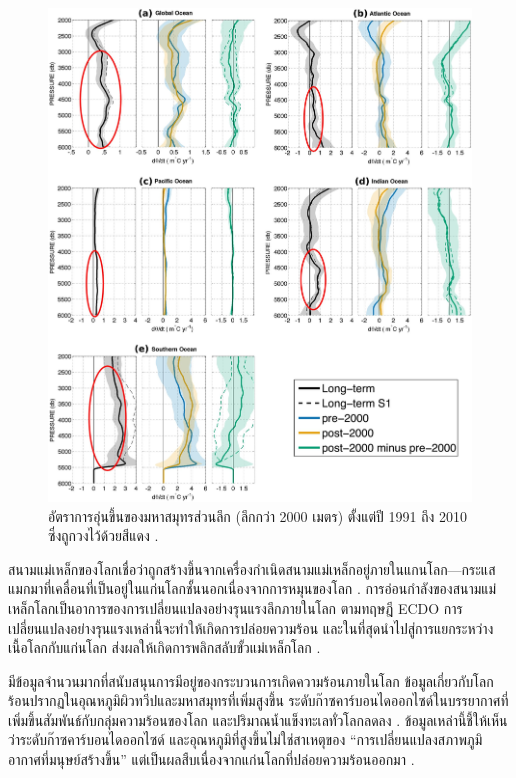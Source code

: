 \documentclass[10pt,twocolumn,letterpaper]{article}
\begin{document}
\begin{figure}[t]
\begin{center}
   \includegraphics[width=1\linewidth]{ocean-highlight.jpg}
\end{center}
   \caption{อัตราการอุ่นขึ้นของมหาสมุทรส่วนลึก (ลึกกว่า 2000 เมตร) ตั้งแต่ปี 1991 ถึง 2010 ซึ่งถูกวงไว้ด้วยสีแดง \cite{132}.}
\label{fig:15}
\label{fig:onecol}
\end{figure}

สนามแม่เหล็กของโลกเชื่อว่าถูกสร้างขึ้นจากเครื่องกำเนิดสนามแม่เหล็กอยู่ภายในแกนโลก—กระแสแมกมาที่เคลื่อนที่เป็นอยู่ในแก่นโลกชั้นนอกเนื่องจากการหมุนของโลก \cite{123}. การอ่อนกำลังของสนามแม่เหล็กโลกเป็นอาการของการเปลี่ยนแปลงอย่างรุนแรงลึกภายในโลก ตามทฤษฎี ECDO การเปลี่ยนแปลงอย่างรุนแรงเหล่านี้จะทำให้เกิดการปล่อยความร้อน และในที่สุดนำไปสู่การแยกระหว่างเนื้อโลกกับแก่นโลก ส่งผลให้เกิดการพลิกสลับขั้วแม่เหล็กโลก \cite{1}.

มีข้อมูลจำนวนมากที่สนับสนุนการมีอยู่ของกระบวนการเกิดความร้อนภายในโลก ข้อมูลเกี่ยวกับโลกร้อนปรากฏในอุณหภูมิผิวทวีปและมหาสมุทรที่เพิ่มสูงขึ้น \cite{127,128} ระดับก๊าซคาร์บอนไดออกไซด์ในบรรยากาศที่เพิ่มขึ้นสัมพันธ์กับกลุ่มความร้อนของโลก \cite{129,130} และปริมาณน้ำแข็งทะเลทั่วโลกลดลง \cite{131}. ข้อมูลเหล่านี้ชี้ให้เห็นว่าระดับก๊าซคาร์บอนไดออกไซด์ และอุณหภูมิที่สูงขึ้นไม่ใช่สาเหตุของ “การเปลี่ยนแปลงสภาพภูมิอากาศที่มนุษย์สร้างขึ้น” แต่เป็นผลสืบเนื่องจากแก่นโลกที่ปล่อยความร้อนออกมา \cite{129}.
\end{document}
